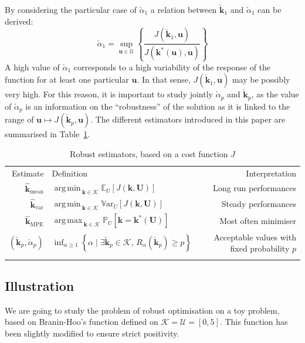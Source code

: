 \documentclass[npg, manuscript]{copernicus}
\DeclareMathOperator*{\argmin}{arg\,min \,}
\DeclareMathOperator*{\argmax}{arg\,max \,}
\newcommand{\Var}{\mathbb{V}\textrm{ar}}
\newcommand{\Ex}{\mathbb{E}}
\newcommand{\Prob}{\mathbb{P}}
\newcommand{\checkap}{\check{\alpha}_p}
\newcommand{\checkkp}{\check{\mathbf{k}}_p}
\begin{document}
By considering the particular case of $\check{\alpha}_1$ a relation between $\check{\mathbf{k}}_1$ and $\check{\alpha}_1$ can be derived:
\begin{equation}
  \label{eq:upper_bound_alpha_check}
  \check{\alpha}_1 = \sup_{\mathbf{u}\in\mathcal{U}} \left\{\frac{J(\check{\mathbf{k}}_1,\mathbf{u})}{J(\mathbf{k}^*(\mathbf{u}), \mathbf{u})} \right\} 
\end{equation}
A high value of $\check{\alpha}_1$ corresponds to a high variability of the response of the function for at least one particular $\mathbf{u}$. In that sense, $J(\check{\mathbf{k}}_1,\mathbf{u})$ may be possibly very high.
For this reason, it is important to study jointly $\checkap$ and $\checkkp$, as the value of $\checkap$ is an information on the ``robustness'' of the solution as it is linked to the range of $\mathbf{u}\mapsto J(\check{\mathbf{k}}_p,\mathbf{u})$.
The different estimators introduced in this paper are summarised in Table~\ref{tab:RO_recap}.

\begin{table}[!h]
  \caption{Robust estimators, based on a cost function $J$}
  \label{tab:RO_recap}
\begin{tabular}{rlr}
  \tophline
  Estimate & Definition & Interpretation \\
  \middlehline
  $\hat{\mathbf{k}}_{\mathrm{mean}}$ & $\argmin_{\mathbf{k}\in\mathcal{K}} \Ex_U\left[J(\mathbf{k},\mathbf{U})\right]$& Long run performances\\
  $\hat{\mathbf{k}}_{\mathrm{var}}$ & $\argmin_{\mathbf{k}\in\mathcal{K}} \Var_U\left[J(\mathbf{k},\mathbf{U})\right]$ & Steady performances\\
  $\hat{\mathbf{k}}_{\mathrm{MPE}}$ & $\argmax_{\mathbf{k}\in\mathcal{K}} \Prob_U\left[\mathbf{k} = \mathbf{k}^*(\mathbf{U})\right]$& Most often minimiser\\
  $(\check{\mathbf{k}}_{p},\check{\alpha}_p)$ &  $\inf_{\alpha\geq 1} \left\{ \alpha \mid \exists \checkkp \in \mathcal{K},\, R_{\alpha}(\checkkp) \geq p \right\} $& Acceptable values with fixed probability $p$ \\
  \bottomhline
\end{tabular}
\end{table}


\subsection{Illustration}
We are going to study the problem of robust optimisation on a toy problem, based on Branin-Hoo's function defined on $\mathcal{K}=\mathcal{U} = [0, 5]$. This function has been slightly modified to ensure strict positivity.
\end{document}
